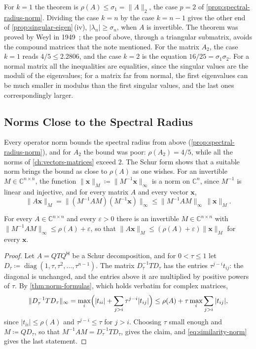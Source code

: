 For $k=1$ the theorem is $\rho(A)\le\sigma_1=\|A\|_2$, the case $p=2$ of \cref{prop:spectral-radius-norm}. Dividing the case $k=n$ by the case $k=n-1$ gives the other end of \cref{prop:singular-eigen}\,(iv), $|\lambda_n|\ge\sigma_n$, when $A$ is invertible. The theorem was proved by Weyl in 1949~\cite{weyl1949}; the proof above, through a triangular submatrix, avoids the compound matrices that the note mentioned. For the matrix $A_2$, the case $k=1$ reads $4/5\le2.2806$, and the case $k=2$ is the equation $16/25=\sigma_1\sigma_2$. For a normal matrix all the inequalities are equalities, since the singular values are the moduli of the eigenvalues; for a matrix far from normal, the first eigenvalues can be much smaller in modulus than the first singular values, and the last ones correspondingly larger.

\subsection{Norms Close to the Spectral Radius}

Every operator norm bounds the spectral radius from above (\cref{prop:spectral-radius-norm}), and for $A_2$ the bound was poor: $\rho(A_2)=4/5$, while all the norms of \cref{ch:vectors-matrices} exceed $2$. The Schur form shows that a suitable norm brings the bound as close to $\rho(A)$ as one wishes. For an invertible $M\in\mathbb C^{n\times n}$, the function $\|\mathbf x\|_M\coloneqq\|M^{-1}\mathbf x\|_\infty$ is a norm on $\mathbb C^n$, since $M^{-1}$ is linear and injective, and for every matrix $A$ and every vector $\mathbf x$,
\begin{equation}
\|A\mathbf x\|_M=\|(M^{-1}AM)(M^{-1}\mathbf x)\|_\infty\le\|M^{-1}AM\|_\infty\,\|\mathbf x\|_M .
\label{eq:similarity-norm}
\end{equation}

\begin{proposition}
\label{prop:norm-near-radius}
For every $A\in\mathbb C^{n\times n}$ and every $\varepsilon>0$ there is an invertible $M\in\mathbb C^{n\times n}$ with $\|M^{-1}AM\|_\infty\le\rho(A)+\varepsilon$, so that $\|A\mathbf x\|_M\le(\rho(A)+\varepsilon)\|\mathbf x\|_M$ for every $\mathbf x$.
\end{proposition}

\begin{proof}
Let $A=QTQ^{\mathsf H}$ be a Schur decomposition, and for $0<\tau\le1$ let $D_\tau\coloneqq\operatorname{diag}(1,\tau,\tau^2,\ldots,\tau^{n-1})$. The matrix $D_\tau^{-1}TD_\tau$ has the entries $\tau^{j-i}t_{ij}$: the diagonal is unchanged, and the entries above it are multiplied by positive powers of $\tau$. By \cref{thm:norm-formulas}, which holds verbatim for complex matrices,
\[
\|D_\tau^{-1}TD_\tau\|_\infty=\max_i\Bigl(|t_{ii}|+\sum_{j>i}\tau^{j-i}|t_{ij}|\Bigr)\le\rho(A)+\tau\max_i\sum_{j>i}|t_{ij}| ,
\]
since $|t_{ii}|\le\rho(A)$ and $\tau^{j-i}\le\tau$ for $j>i$. Choosing $\tau$ small enough and $M\coloneqq QD_\tau$, so that $M^{-1}AM=D_\tau^{-1}TD_\tau$, gives the claim, and \eqref{eq:similarity-norm} gives the last statement.
\end{proof}

